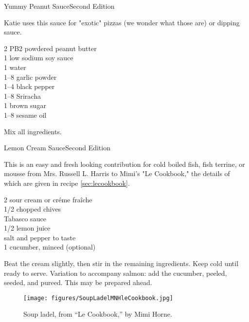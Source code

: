 \begin{entry}{Yummy Peanut Sauce}{Second Edition}

\begin{open}
 Katie uses this sauce for "exotic" pizzas (we wonder what those are) or dipping sauce. 
\end{open}
\begin{ingredients}
  \SI{2}{\tblspoon} PB2 powdered peanut butter \\
  \SI{1}{\teaspoon} low sodium soy sauce \\
  \SI{1}{\tblspoon} water \\
  \SIrange{1}{8}{\teaspoon} garlic powder \\ 
 \SIrange{1}{4}{\teaspoon} black pepper \\  
  \SIrange{1}{8}{\teaspoon} Sriracha \\ 
 \SI{1}{\tblspoon} brown sugar \\
   \SIrange{1}{8}{\teaspoon} sesame oil 
\end{ingredients}

Mix all ingredients.

\end{entry}

\begin{entry}{Lemon Cream Sauce}{Second Edition}

\begin{open}
 This is an easy and fresh looking contribution for cold boiled fish, fish terrine, or mousse from Mrs. Russell L. Harris to Mimi's "Le Cookbook," the details of which are given in recipe \ref{sec:lecookbook}. 
\end{open}
\begin{ingredients}
   \SI{2}{\cup} sour cream or cr\'eme fra\^iche \\
  \SI{1/2}{\cup} chopped chives \\
  Tabasco sauce \\
  \SI{1/2}{\cup} lemon juice \\
  salt and pepper to taste \\
 \SI{1}{\cup} cucumber, minced (optional) 
 
\end{ingredients}

Beat the cream slightly, then stir in the remaining ingredients. Keep cold until ready to serve. Variation to accompany salmon: add the cucumber, peeled, seeded, and pureed. This may be prepared ahead.

\begin{figure}
    \centering
    \texttt{[image: figures/SoupLadelMNHleCookbook.jpg]}
    \caption{Soup ladel, from ``Le Cookbook,'' by Mimi Horne.}
    \label{fig:mimi_ladel}
\end{figure}
\end{entry}

